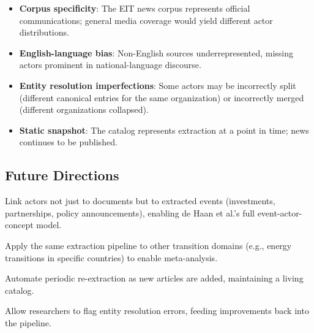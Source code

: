 \documentclass[../main.tex]{subfiles}
\begin{document}
\begin{criticalbox}
\begin{itemize}[leftmargin=*, itemsep=0.3em]
\item \textbf{Corpus specificity}: The EIT news corpus represents official communications; general media coverage would yield different actor distributions.

\item \textbf{English-language bias}: Non-English sources underrepresented, missing actors prominent in national-language discourse.

\item \textbf{Entity resolution imperfections}: Some actors may be incorrectly split (different canonical entries for the same organization) or incorrectly merged (different organizations collapsed).

\item \textbf{Static snapshot}: The catalog represents extraction at a point in time; news continues to be published.
\end{itemize}
\end{criticalbox}

\subsection{Future Directions}

\begin{description}[leftmargin=0.5cm, itemsep=0.3em]

\item[Event-Actor Integration] Link actors not just to documents but to extracted events (investments, partnerships, policy announcements), enabling de Haan et al.'s full event-actor-concept model.

\item[Cross-Case Comparison] Apply the same extraction pipeline to other transition domains (e.g., energy transitions in specific countries) to enable meta-analysis.

\item[Continuous Updates] Automate periodic re-extraction as new articles are added, maintaining a living catalog.

\item[User Corrections] Allow researchers to flag entity resolution errors, feeding improvements back into the pipeline.

\end{description}


\clearpage
\end{document}
